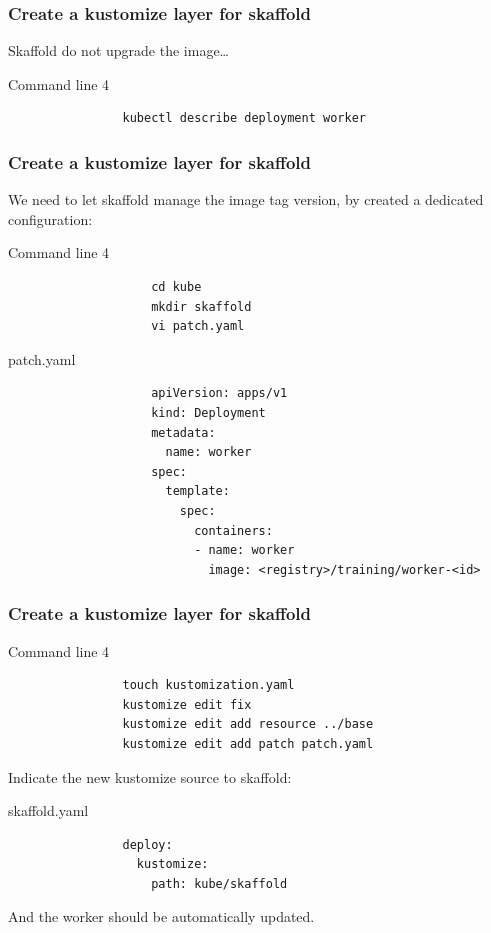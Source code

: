 	\begin{frame}[fragile]
		\frametitle{Create a kustomize layer for skaffold}
		
		Skaffold do not upgrade the image…
		\begin{block}{Command line 4}
			\begin{verbatim}
				kubectl describe deployment worker
			\end{verbatim}
		\end{block}
		
	\end{frame}
	
	\begin{frame}[fragile]
		\frametitle{Create a kustomize layer for skaffold}
		We need to let skaffold manage the image tag version, by created a dedicated configuration:
		\begin{block}{Command line 4}
			\begin{small}
				\begin{verbatim}
					cd kube
					mkdir skaffold
					vi patch.yaml
				\end{verbatim}
			\end{small}
		\end{block}
		
		\begin{block}{patch.yaml}
			\begin{tiny}
				\begin{verbatim}
					apiVersion: apps/v1
					kind: Deployment
					metadata:
					  name: worker
					spec:
					  template:
					    spec:
					      containers:
					      - name: worker
					        image: <registry>/training/worker-<id>
				\end{verbatim}
			\end{tiny}
		\end{block}
	\end{frame}
	
	\begin{frame}[fragile]
		\frametitle{Create a kustomize layer for skaffold}

		\begin{block}{Command line 4}
			\begin{verbatim}
				touch kustomization.yaml
				kustomize edit fix
				kustomize edit add resource ../base
				kustomize edit add patch patch.yaml
			\end{verbatim}
		\end{block}
		Indicate the new kustomize source to skaffold:
		\begin{block}{skaffold.yaml}
			\begin{verbatim}
				deploy:
				  kustomize:
				    path: kube/skaffold
			\end{verbatim}
		\end{block}
		And the worker should be automatically updated.
		
	\end{frame}
	
